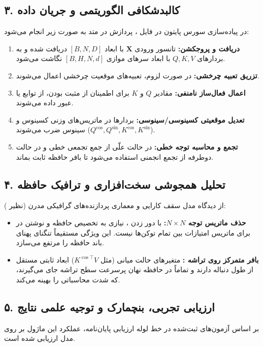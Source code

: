 \subsection*{۳. کالبدشکافی الگوریتمی و جریان داده }
در پیاده‌سازی سورس پایتون در فایل ، پردازش در متد  به صورت زیر انجام می‌شود:
\begin{enumerate}
\item \textbf{دریافت و پروجکشن:} تانسور ورودی $\mathbf{X}$ با ابعاد $[B, N, D]$ دریافت شده و به بردارهای $Q, K, V$ با ابعاد سرهای موازی $[B, H, N, d]$ نگاشت می‌شود.
\item \textbf{تزریق تعبیه چرخشی:} در صورت لزوم، تعبیه‌های موقعیت چرخشی  اعمال می‌شوند.
\item \textbf{اعمال فعال‌ساز نامنفی:} مقادیر $Q$ و $K$ برای اطمینان از مثبت بودن، از توابع  یا  عبور داده می‌شوند.
\item \textbf{تعدیل موقعیتی کسینوسی/سینوسی:} بردارها در ماتریس‌های وزنی کسینوس و سینوس ضرب می‌شوند ($Q^{\cos}, Q^{\sin}, K^{\cos}, K^{\sin}$).
\item \textbf{تجمع و محاسبه توجه خطی:} در حالت علّی  از جمع تجمعی خطی  و در حالت دوطرفه از تجمع انجمنی  استفاده می‌شود تا بافر حافظه ثابت بماند.
\end{enumerate}

\subsection*{۴. تحلیل همجوشی سخت‌افزاری و ترافیک حافظه }
از دیدگاه مدل سقف کارایی  و معماری پردازنده‌های گرافیکی مدرن (نظیر ):
\begin{itemize}
\item \textbf{حذف ماتریس توجه $N \times N$:} با دور زدن ، نیازی به تخصیص حافظه و نوشتن در  برای ماتریس امتیازات بین تمام توکن‌ها نیست. این ویژگی مستقیماً تنگنای پهنای باند حافظه  را مرتفع می‌سازد.
\item \textbf{بافر متمرکز روی تراشه :} متغیرهای حالت میانی (مثل $K^{\cos \top} V$) ابعاد ثابتی مستقل از طول دنباله دارند و تماماً در حافظه نهان پرسرعت سطح تراشه جای می‌گیرند، که شدت محاسباتی را بهینه می‌کند.
\end{itemize}

\subsection*{۵. ارزیابی تجربی، بنچمارک و توجیه علمی نتایج}
بر اساس آزمون‌های ثبت‌شده در خط لوله ارزیابی پایان‌نامه، عملکرد این ماژول بر روی مدل  ارزیابی شده است.


